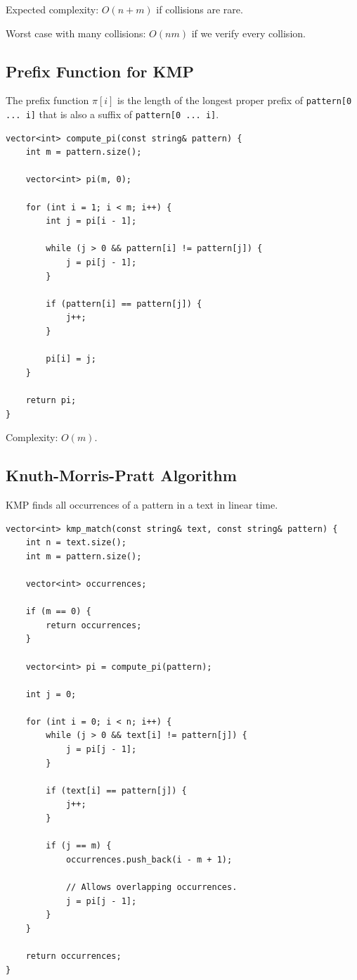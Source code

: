 \documentclass[11pt]{article}
\begin{document}
Expected complexity: $O(n + m)$ if collisions are rare.

Worst case with many collisions: $O(nm)$ if we verify every collision.

\subsection{Prefix Function for KMP}

The prefix function $\pi[i]$ is the length of the longest proper prefix of
\texttt{pattern[0 ... i]} that is also a suffix of \texttt{pattern[0 ... i]}.

\begin{lstlisting}
vector<int> compute_pi(const string& pattern) {
    int m = pattern.size();

    vector<int> pi(m, 0);

    for (int i = 1; i < m; i++) {
        int j = pi[i - 1];

        while (j > 0 && pattern[i] != pattern[j]) {
            j = pi[j - 1];
        }

        if (pattern[i] == pattern[j]) {
            j++;
        }

        pi[i] = j;
    }

    return pi;
}
\end{lstlisting}

Complexity: $O(m)$.

\subsection{Knuth-Morris-Pratt Algorithm}

KMP finds all occurrences of a pattern in a text in linear time.

\begin{lstlisting}
vector<int> kmp_match(const string& text, const string& pattern) {
    int n = text.size();
    int m = pattern.size();

    vector<int> occurrences;

    if (m == 0) {
        return occurrences;
    }

    vector<int> pi = compute_pi(pattern);

    int j = 0;

    for (int i = 0; i < n; i++) {
        while (j > 0 && text[i] != pattern[j]) {
            j = pi[j - 1];
        }

        if (text[i] == pattern[j]) {
            j++;
        }

        if (j == m) {
            occurrences.push_back(i - m + 1);

            // Allows overlapping occurrences.
            j = pi[j - 1];
        }
    }

    return occurrences;
}
\end{lstlisting}
\end{document}
